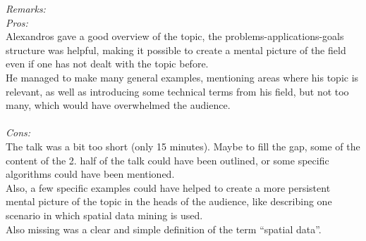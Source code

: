 \documentclass[runningheads,a4paper]{llncs}
\begin{document}
\noindent\textit{Remarks:}\\
\textit{Pros:}\\
Alexandros gave a good overview of the topic, the problems-applications-goals structure was helpful, making it possible to create a mental picture of the field even if one has not dealt with the topic before.\\
He managed to make many general examples, mentioning areas where his topic is relevant, as well as introducing some technical terms from his field, but not too many, which would have overwhelmed the audience.\\
\\
\textit{Cons:}\\
The talk was a bit too short (only 15 minutes). Maybe to fill the gap, some of the content of the 2. half of the talk could have been outlined, or some specific algorithms could have been mentioned.\\
Also, a few specific examples could have helped to create a more persistent mental picture of the topic in the heads of the audience, like describing one scenario in which spatial data mining is used.\\
Also missing was a clear and simple definition of the term ``spatial data''.


\newpage
\end{document}
